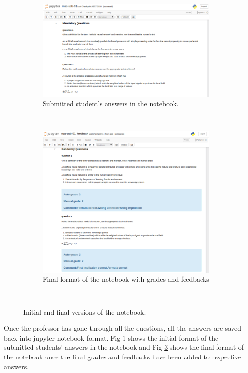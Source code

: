 	
	\begin{figure}[!htb]
		\begin{subfigure}[b]{0.5\textwidth}
			\includegraphics[width=\textwidth]{images/gui_4}
			\caption{Submitted student's answers in the notebook.}
			\label{gui_4}
		\end{subfigure}
		~
		\begin{subfigure}[b]{0.35\textwidth}
			\includegraphics[width=\textwidth]{images/gui_3}
			\caption{Final format of the notebook with grades and feedbacks}
			\label{gui_3}
		\end{subfigure}
		~
		\caption{Initial and final versions of the notebook.}
	\end{figure}
	
	
	Once the professor has gone through all the questions, all the answers are saved back into jupyter notebook format. Fig \ref{gui_4} shows the initial format of the submitted students' answers in the notebook and Fig \ref{gui_3} shows the final format of the notebook once the final grades and feedbacks have been added to respective answers.
	
